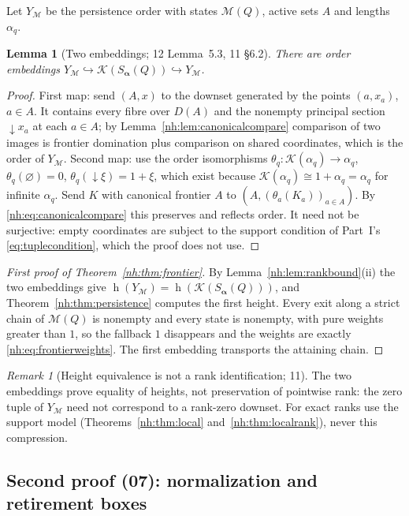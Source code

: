 \documentclass[11pt,a4paper]{article}
\newtheorem{lemma}[theorem]{Lemma}
\theoremstyle{definition}
\theoremstyle{remark}
\newtheorem{remark}[theorem]{Remark}
\newcommand{\K}{\mathcal K}
\newcommand{\M}{\mathcal M}
\newcommand{\hgt}{\operatorname{h}}
\begin{document}
Let $Y_{\M}$ be the persistence order with states $\M(Q)$, active sets $A$ and
lengths $\alpha_q$.

\begin{lemma}[Two embeddings; 12 Lemma~5.3, 11 \S6.2]\label{nh:lem:twoembeddings}
There are order embeddings
$Y_{\M}\hookrightarrow\K(S_{\boldsymbol\alpha}(Q))\hookrightarrow Y_{\M}$.
\end{lemma}
\begin{proof}
First map: send $(A,x)$ to the downset generated by the points $(a,x_a)$,
$a\in A$. It contains every fibre over $D(A)$ and the nonempty principal
section ${\downarrow}x_a$ at each $a\in A$; by
Lemma~\ref{nh:lem:canonicalcompare} comparison of two images is frontier
domination plus comparison on shared coordinates, which is the order of
$Y_{\M}$. Second map: use the order isomorphisms
$\theta_q:\K(\alpha_q)\to\alpha_q$, $\theta_q(\varnothing)=0$,
$\theta_q({\downarrow}\xi)=1+\xi$, which exist because
$\K(\alpha_q)\cong1+\alpha_q=\alpha_q$ for infinite $\alpha_q$. Send $K$ with
canonical frontier $A$ to $(A,(\theta_a(K_a))_{a\in A})$. By
\eqref{nh:eq:canonicalcompare} this preserves and reflects order. It need not
be surjective: empty coordinates are subject to the support condition of
Part~I's \eqref{eq:tuplecondition}, which the proof does not use.
\end{proof}

\begin{proof}[First proof of Theorem~\ref{nh:thm:frontier}]
By Lemma~\ref{nh:lem:rankbound}(ii) the two embeddings give
$\hgt(Y_{\M})=\hgt(\K(S_{\boldsymbol\alpha}(Q)))$, and
Theorem~\ref{nh:thm:persistence} computes the first height. Every exit along a
strict chain of $\M(Q)$ is nonempty and every state is nonempty, with pure
weights greater than $1$, so the fallback $1$ disappears and the weights are
exactly \eqref{nh:eq:frontierweights}. The first embedding transports the
attaining chain.
\end{proof}

\begin{remark}[Height equivalence is not a rank identification; 11]
\label{nh:rem:notlocal}
The two embeddings prove equality of heights, not preservation of pointwise
rank: the zero tuple of $Y_{\M}$ need not correspond to a rank-zero downset. For
exact ranks use the support model (Theorems~\ref{nh:thm:local}
and~\ref{nh:thm:localrank}), never this compression.
\end{remark}

\subsection{Second proof (07): normalization and retirement boxes}
\end{document}
